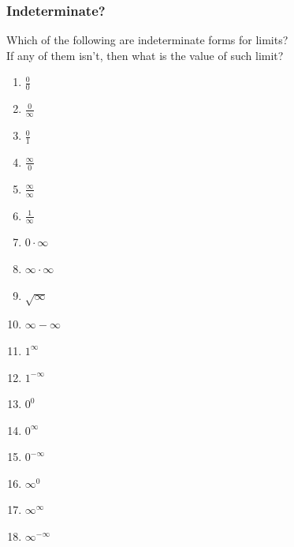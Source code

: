 \documentclass[14pt]{beamer}
\begin{document}
	\begin{frame}[t]
		\frametitle{Indeterminate?}

		Which of the following are indeterminate forms for limits? \\ If any of them
		isn't, then what is the value of such limit?

		\begin{multicols}{4}
			\begin{enumerate}
				\setlength{\itemsep}{1em}

				\item $\displaystyle \frac{0}{0}$

				\item $\displaystyle \frac{0}{\infty}$

				\item $\displaystyle \frac{0}{1}$

				\item $\displaystyle \frac{\infty}{0}$

				\item $\displaystyle \frac{\infty}{\infty}$

				\item $\displaystyle \frac{1}{\infty}$

				\item $\displaystyle 0 \cdot \infty$ 

				\item $\displaystyle \infty \cdot \infty$ 

				\item $\displaystyle \sqrt{\infty}$

				\item $\displaystyle \infty - \infty$

				\item $\displaystyle 1^{\infty}$

				\item $\displaystyle 1^{-\infty}$

				\item $\displaystyle 0^{0}$

				\item $\displaystyle 0^{\infty}$

				\item $\displaystyle 0^{-\infty}$

				\item $\displaystyle \infty^{0}$

				\item $\displaystyle \infty^{\infty}$

				\item $\displaystyle \infty^{-\infty}$
			\end{enumerate}
		\end{multicols}
	\end{frame}
\end{document}

